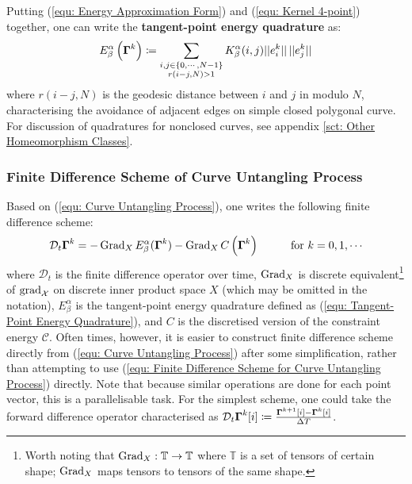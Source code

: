 \documentclass[../dissertation.tex]{subfiles}
\begin{document}
Putting (\ref{equ: Energy Approximation Form}) and (\ref{equ: Kernel 4-point}) together,
one can write the \textbf{tangent-point energy quadrature} as:
\begin{equation}
    E_{\beta}^{\alpha} \left( \boldsymbol{\Gamma}^k \right) \coloneqq \sum_{\substack{i, j \in \left\{ 0, \cdots, N-1 \right\} \\ r \left( i-j,N \right) > 1}} K_{\beta}^{\alpha} (i,j) \lvert \lvert e_i^k \rvert \rvert \, \lvert \lvert e_j^k \rvert \rvert
    \label{equ: Tangent-Point Energy Quadrature}
\end{equation}
where $r\left( i-j,N \right)$ is the geodesic distance between $i$ and $j$ in modulo $N$,
characterising the avoidance of adjacent edges on simple closed polygonal curve.
For discussion of quadratures for nonclosed curves, see appendix \ref{sct: Other Homeomorphism Classes}.


\subsubsection{Finite Difference Scheme of Curve Untangling Process}
Based on (\ref{equ: Curve Untangling Process}), one writes the following finite difference scheme:
\begin{equation}
    \mathcal{D}_{t} \Gammabf^{k} = -\Grad_{X} E_{\beta}^{\alpha} (\Gammabf^k) - \Grad_{X} C \left( \Gammabf^k \right) \hspace{1cm} \text{for } k=0,1,\cdots
    \label{equ: Finite Difference Scheme for Curve Untangling Process}
\end{equation}
where $\mathcal{D}_t$ is the finite difference operator over time,
$\operatorname{Grad}_{X}$ is discrete equivalent\footnote{Worth noting that $\operatorname{Grad}_X:\mathbb{T} \rightarrow \mathbb{T}$ where $\mathbb{T}$ is a set of tensors of certain shape; $\operatorname{Grad}_X$ maps tensors to tensors of the same shape.}  of $\operatorname{grad}_{\mathcal{X}}$ on discrete inner product space $X$ (which may be omitted in the notation),
$E_{\beta}^{\alpha}$ is the tangent-point energy quadrature defined as (\ref{equ: Tangent-Point Energy Quadrature}),
and $C$ is the discretised version of the constraint energy $\mathcal{C}$.
Often times, however, it is easier to construct finite difference scheme directly from (\ref{equ: Curve Untangling Process}) after some simplification,
rather than attempting to use (\ref{equ: Finite Difference Scheme for Curve Untangling Process}) directly.
Note that because similar operations are done for each point vector, this is a parallelisable task.
For the simplest scheme, one could take the forward difference operator characterised as $\mathcal{D}_t \boldsymbol{\Gamma}^k[i] \coloneqq \frac{\boldsymbol{\Gamma}^{k+1}[i] - \boldsymbol{\Gamma}^{k}[i]}{\Delta T}$.
\end{document}
